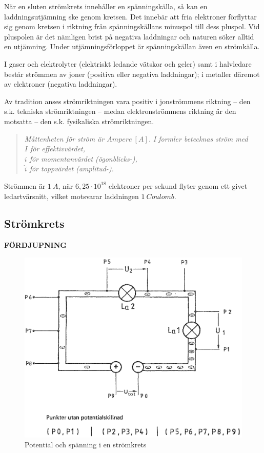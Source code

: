 När en sluten strömkrets innehåller en spänningskälla, så kan en
laddningsutjämning ske genom kretsen. Det innebär att fria elektroner
förflyttar sig genom kretsen i riktning från spänningskällans minuspol till
dess pluspol. Vid pluspolen är det nämligen brist på negativa laddningar och
naturen söker alltid en utjämning. Under utjämningsförloppet är spänningskällan
även en strömkälla.

I gaser och elektrolyter (elektriskt ledande vätskor och geler) samt i
halvledare består strömmen av joner (positiva eller negativa laddningar);
i metaller däremot av elektroner (negativa laddningar).

Av tradition anses strömriktningen vara positiv i jonströmmens riktning -- den
s.k. tekniska strömriktningen -- medan elektronströmmens riktning är den
motsatta -- den s.k. fysikaliska strömriktningen.

\begin{quote}
\emph{Måttenheten för ström är \(Ampere\ [A]\).}
\emph{I formler betecknas ström med} \\
\emph{\(I\) för effektivvärdet,} \\
\emph{\(i\) för momentanvärdet (ögonblicks-),} \\
\emph{\(\hat{i}\) för toppvärdet (amplitud-).}
\end{quote}

Strömmen är \(1\ A\), när \(6,25 \cdot 10^{18}\) elektroner per sekund flyter genom ett givet
ledartvärsnitt, vilket motsvarar laddningen \(1\ Coulomb\).

\subsection{Strömkrets}
\textbf{FÖRDJUPNING}

\begin{figure}
\begin{center}
\includegraphics[width=\textwidth]{images/cropped_pdfs/bild_2_1-03.pdf}
\caption{Potential och spänning i en strömkrets}
\label{fig:BildII1-3}
\end{center}
\end{figure}

